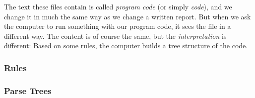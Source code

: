 The text these files contain is called \textsl{program code} (or simply \textsl{code}), and we change it in much the same way as we change a written report. But when we ask the computer to run something with our program code, it sees the file in a different way. The content is of course the same, but the \textsl{interpretation} is different: Based on some rules, the computer builds a tree structure of the code.


\subsubsection{Rules}


\subsubsection{Parse Trees}

